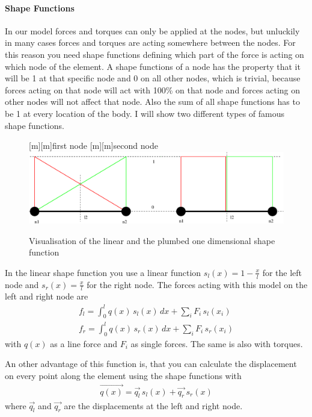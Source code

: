   \paragraph{Shape Functions} In our model forces and torques can only be applied at the nodes, but unluckily in many cases forces and torques are acting somewhere between the nodes. For this reason you need shape functions defining which part of the force is acting on which node of the element. A shape functions of a node has the property that it will be 1 at that specific node and 0 on all other nodes, which is trivial, because forces acting on that node will act with 100\% on that node and forces acting on other nodes will not affect that node. Also the sum of all shape functions has to be 1 at every location of the body. I will show two different types of famous shape functions.
\bigskip

\begin{figure}[!h]
\begin{center}
[m][m]{first node}
[m][m]{second node}
\includegraphics[scale=0.6]{figs/shapeFunctions} 
\caption{Visualisation of the linear and the plumbed one dimensional shape function}
\label{shapeFunctions}
\end{center}
\end{figure}
In the linear shape function you use a linear function $s_l(x)=1-\frac{x}{l}$ for the left node and $s_r(x)=\frac{x}{l}$ for the right node. The forces acting with this model on the left and right node are
\begin{align}
f_l=\int_0^lq(x)\,s_l(x)\,dx+\sum_iF_i\,s_l(x_i) \nonumber \\
f_r=\int_0^lq(x)\,s_r(x)\,dx+\sum_iF_i\,s_r(x_i) \nonumber
\end{align}
with $q(x)$ as a line force and $F_i$ as single forces. The same is also with torques.
\bigskip

An other advantage of this function is, that you can calculate the displacement on every point along the element using the shape functions with
\begin{align}
\vec{q(x)}=\vec{q_l}\,s_l(x)+\vec{q_r}\,s_r(x)
\end{align}
where $\vec{q_l}$ and $\vec{q_r}$ are the displacements at the left and right node.
\bigskip

